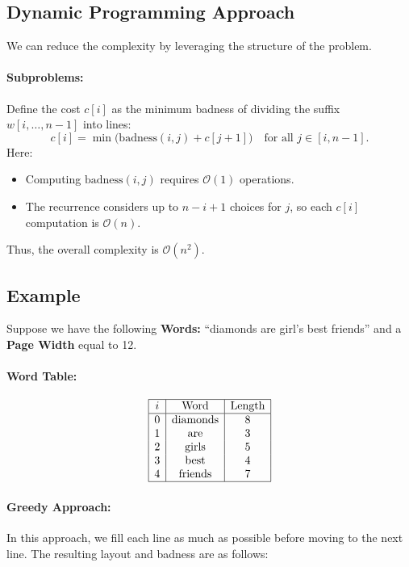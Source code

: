 \subsection{Dynamic Programming Approach}
We can reduce the complexity by leveraging the structure of the problem.

\paragraph{Subproblems:} 
Define the cost $c[i]$ as the minimum badness of dividing the suffix $w[i, \ldots, n-1]$ into lines:
\[
c[i] = \min\big(\text{badness}(i, j) + c[j+1]\big) \quad \text{for all } j \in [i, n-1].
\]
Here:
\begin{itemize}
    \item Computing $\text{badness}(i, j)$ requires $\mathcal{O}(1)$ operations.
    \item The recurrence considers up to $n-i+1$ choices for $j$, so each $c[i]$ computation is $\mathcal{O}(n)$.
\end{itemize}
Thus, the overall complexity is $\mathcal{O}(n^2)$.

\subsection{Example}
Suppose we have the following \textbf{Words:} ``diamonds are girl's best friends'' and a
\textbf{Page Width} equal to 12.

\paragraph{Word Table:}
\[
\begin{array}{|c|c|c|}
\hline
i & \text{Word} & \text{Length} \\
\hline
0 & \text{diamonds} & 8 \\
1 & \text{are} & 3 \\
2 & \text{girls} & 5 \\
3 & \text{best} & 4 \\
4 & \text{friends} & 7 \\
\hline
\end{array}
\]

\paragraph{Greedy Approach:}
In this approach, we fill each line as much as possible before moving to the next line. The resulting layout and badness are as follows:


